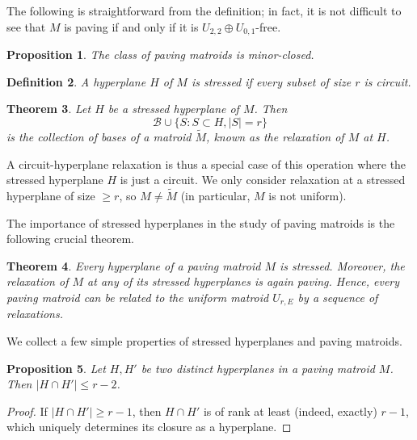 \documentclass{amsart}
\newtheorem{theorem}{Theorem}[section]
\newtheorem{proposition}[theorem]{Proposition}
\newtheorem{definition}[theorem]{Definition}
\newcommand\Bcal{{\mathcal B}}
\begin{document}
The following is straightforward from the definition; in fact, it is not difficult to see that $M$ is paving if and only if it is $U_{2,2}\oplus U_{0,1}$-free.

\begin{proposition} \label{prop:minor-closed}
    The class of paving matroids is minor-closed.
\end{proposition}

\begin{definition} \label{def:SHP}
    A hyperplane $H$ of $M$ is {\em stressed} if every subset of size $r$ is circuit.
\end{definition}

\begin{theorem} \cite{bonin2008, ferroni2023stressed} \label{thm:SHR}
    Let $H$ be a stressed hyperplane of $M$. Then 
    $$\Bcal\cup\{S: S\subset H, |S|=r\}$$
    is the collection of bases of a matroid $\widetilde{M}$, known as the {\em relaxation} of $M$ at $H$.
\end{theorem}

A circuit-hyperplane relaxation is thus a special case of this operation where the stressed hyperplane $H$ is just a circuit. We only consider relaxation at a stressed hyperplane of size $\geq r$, so $M\neq\widetilde{M}$ (in particular, $M$ is not uniform).

The importance of stressed hyperplanes in the study of paving matroids is the following crucial theorem.

\begin{theorem} \cite{ferroni2023stressed} \label{thm:PM_SHR}
    Every hyperplane of a paving matroid $M$ is stressed. Moreover, the relaxation of $M$ at any of its stressed hyperplanes is again paving. Hence, every paving matroid can be related to the uniform matroid $U_{r,E}$ by a sequence of relaxations.
\end{theorem}

We collect a few simple properties of stressed hyperplanes and paving matroids.

\begin{proposition} \label{prop:SH_intersection}
    Let $H,H'$ be two distinct hyperplanes in a paving matroid $M$. Then $|H\cap H'|\leq r-2$.
\end{proposition}

\begin{proof}
    If $|H\cap H'|\geq r-1$, then $H\cap H'$ is of rank at least (indeed, exactly) $r-1$, which uniquely determines its closure as a hyperplane.
\end{proof}
\end{document}
